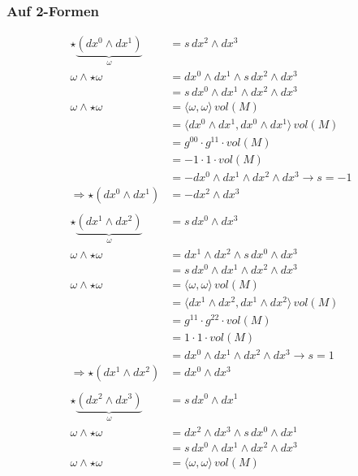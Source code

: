 \subsubsection{Auf 2-Formen}
\begin{align*}
	\star \underbrace{(dx^0 \wedge dx^1)}_{\omega}
	&=
	s \, dx^2 \wedge dx^3
	\\
	\omega \wedge \star \omega
	&=
	dx^0 \wedge dx^1 \wedge s \, dx^2 \wedge dx^3
	\\
	&=
	s \, dx^0 \wedge dx^1 \wedge dx^2 \wedge dx^3
	\\
	\omega \wedge \star \omega
	&=
	\langle \omega, \omega \rangle \, vol(M)
	\\
	&=
	\langle dx^0 \wedge dx^1, dx^0 \wedge dx^1 \rangle \, vol(M)
	\\
	&=
	g^{00} \cdot g^{11} \cdot vol(M)
	\\
	&=
	-1 \cdot 1 \cdot vol(M)
	\\
	&=
	-dx^0 \wedge dx^1 \wedge dx^2 \wedge dx^3 \rightarrow s = -1
	\\
	\Rightarrow \star(dx^0 \wedge dx^1)
	&=
	-dx^2 \wedge dx^3
\\
\\
	\star \underbrace{(dx^1 \wedge dx^2)}_{\omega}
	&=
	s \, dx^0 \wedge dx^3
	\\
	\omega \wedge \star \omega
	&=
	dx^1 \wedge dx^2 \wedge s \, dx^0 \wedge dx^3
	\\
	&=
	s \, dx^0 \wedge dx^1 \wedge dx^2 \wedge dx^3
	\\
	\omega \wedge \star \omega
	&=
	\langle \omega, \omega \rangle \, vol(M)
	\\
	&=
	\langle dx^1 \wedge dx^2, dx^1 \wedge dx^2 \rangle \, vol(M)
	\\
	&=
	g^{11} \cdot g^{22} \cdot vol(M)
	\\
	&=
	1 \cdot 1 \cdot vol(M)
	\\
	&=
	dx^0 \wedge dx^1 \wedge dx^2 \wedge dx^3 \rightarrow s = 1
	\\
	\Rightarrow \star(dx^1 \wedge dx^2)
	&=
	dx^0 \wedge dx^3
\\
\\
	\star \underbrace{(dx^2 \wedge dx^3)}_{\omega}
	&=
	s \, dx^0 \wedge dx^1
	\\
	\omega \wedge \star \omega
	&=
	dx^2 \wedge dx^3 \wedge s \, dx^0 \wedge dx^1
	\\
	&=
	s \, dx^0 \wedge dx^1 \wedge dx^2 \wedge dx^3
	\\
	\omega \wedge \star \omega
	&=
	\langle \omega, \omega \rangle \, vol(M)

\end{align*}
